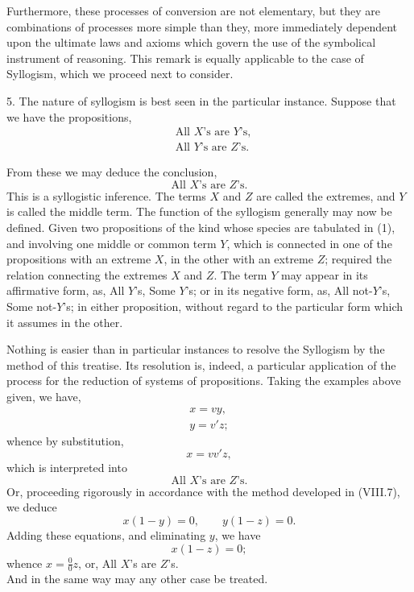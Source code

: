 \documentclass[oneside]{book}
\begin{document}
Furthermore, these processes of conversion are not elementary,
but they are combinations of processes more simple than
they, more immediately dependent upon the ultimate laws and
axioms which govern the use of the symbolical instrument of
reasoning.  This remark is equally applicable to the case of
Syllogism, which we proceed next to consider.

5. The nature of syllogism is best seen in the particular instance.
Suppose that we have the propositions,
\begin{align*}
  &\text{All }X\text{'s are }Y\text{'s},\\
  &\text{All }Y\text{'s are }Z\text{'s}.
\end{align*}

From these we may deduce the conclusion,
\begin{equation*}
\text{All }X\text{'s are }Z\text{'s}.
\end{equation*}
This is a syllogistic inference. The terms $X$ and $Z$ are called
the extremes, and $Y$ is called the middle term. The function
of the syllogism generally may now be defined. Given two propositions
of the kind whose species are tabulated in (1), and involving
one middle or common term $Y$, which is connected in
one of the propositions with an extreme $X$, in the other with an
extreme $Z$; required the relation connecting the extremes $X$ and
$Z$. The term $Y$ may appear in its affirmative form, as, All $Y$'s,
Some $Y$'s; or in its negative form, as, All not-$Y$'s, Some not-$Y$'s; in either proposition, without regard to the particular form
which it assumes in the other.

Nothing is easier than in particular instances to resolve the
Syllogism by the method of this treatise. Its resolution is, indeed,
a particular application of the process for the reduction of
systems of propositions. Taking the examples above given,
we have,
\begin{gather*}
  x = vy,\\
  y = v'z;
\end{gather*}
whence by substitution,
\begin{equation*}
x = vv'z,
\end{equation*}
which is interpreted into
\begin{equation*}
\text{All }X\text{'s are }Z\text{'s}.
\end{equation*}
Or, proceeding rigorously in accordance with the method developed
in (VIII.7), we deduce
\begin{equation*}
x(1-y)=0,\quad\quad y(1-z)=0.
\end{equation*}
Adding these equations, and eliminating $y$, we have
\begin{equation*}
x(1-z)=0;
\end{equation*}
whence $x = \frac{0}{0}z$, or, All $X$'s are $Z$'s.\\
And in the same way may any other case be treated.
\end{document}
